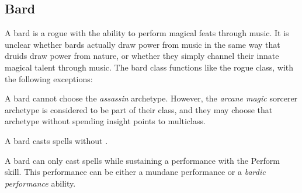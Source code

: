   \subsection{Bard}
    A bard is a rogue with the ability to perform magical feats through music.
    It is unclear whether bards actually draw power from music in the same way that druids draw power from nature, or whether they simply channel their innate magical talent through music.
    The bard class functions like the rogue class, with the following exceptions:
    \begin{raggeditemize}
      \item A bard cannot choose the \textit{assassin} archetype. However, the \textit{arcane magic} sorcerer archetype is considered to be part of their class, and they may choose that archetype without spending insight points to multiclass.
      \item A bard casts spells without .
      \item A bard can only cast spells while sustaining a performance with the Perform skill. This performance can be either a mundane performance or a \textit{bardic performance} ability.
    \end{raggeditemize}

